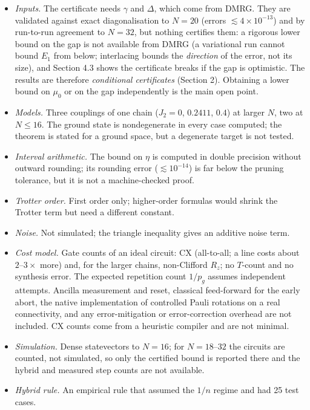 \documentclass[
]{article}
\providecommand{\tightlist}{%
  \setlength{\itemsep}{0pt}\setlength{\parskip}{0pt}}
\begin{document}
\begin{itemize}
\tightlist
\item
  \emph{Inputs.} The certificate needs \(\gamma\) and \(\Delta\), which
  come from DMRG. They are validated against exact diagonalisation to
  \(N=20\) (errors \(\lesssim4\times10^{-13}\)) and by run-to-run
  agreement to \(N=32\), but nothing certifies them: a rigorous lower
  bound on the gap is not available from DMRG (a variational run cannot
  bound \(E_1\) from below; interlacing bounds the \emph{direction} of
  the error, not its size), and Section 4.3 shows the certificate breaks
  if the gap is optimistic. The results are therefore \emph{conditional
  certificates} (Section 2). Obtaining a lower bound on \(\mu_0\) or on
  the gap independently is the main open point.
\item
  \emph{Models.} Three couplings of one chain (\(J_2=0\), \(0.2411\),
  \(0.4\)) at larger \(N\), two at \(N\le16\). The ground state is
  nondegenerate in every case computed; the theorem is stated for a
  ground space, but a degenerate target is not tested.
\item
  \emph{Interval arithmetic.} The bound on \(\eta\) is computed in
  double precision without outward rounding; its rounding error
  (\(\lesssim10^{-14}\)) is far below the pruning tolerance, but it is
  not a machine-checked proof.
\item
  \emph{Trotter order.} First order only; higher-order formulas would
  shrink the Trotter term but need a different constant.
\item
  \emph{Noise.} Not simulated; the triangle inequality gives an additive
  noise term.
\item
  \emph{Cost model.} Gate counts of an ideal circuit: CX (all-to-all; a
  line costs about \(2\)--\(3\times\) more) and, for the larger chains,
  non-Clifford \(R_z\); no \(T\)-count and no synthesis error. The
  expected repetition count \(1/p_g\) assumes independent attempts.
  Ancilla measurement and reset, classical feed-forward for the early
  abort, the native implementation of controlled Pauli rotations on a
  real connectivity, and any error-mitigation or error-correction
  overhead are not included. CX counts come from a heuristic compiler
  and are not minimal.
\item
  \emph{Simulation.} Dense statevectors to \(N=16\); for
  \(N=18\)--\(32\) the circuits are counted, not simulated, so only the
  certified bound is reported there and the hybrid and measured step
  counts are not available.
\item
  \emph{Hybrid rule.} An empirical rule that assumed the \(1/n\) regime
  and had 25 test cases.
\end{itemize}
\end{document}
